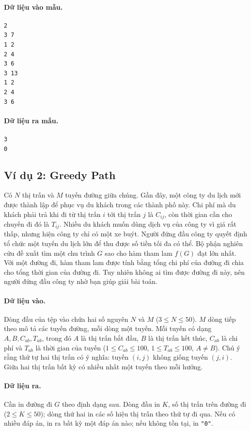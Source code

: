 \documentclass[11pt]{article}
\begin{document}
\paragraph{Dữ liệu vào mẫu.}
\begin{verbatim}
2
3 7
1 2
2 4
3 6
3 13
1 2
2 4
3 6
\end{verbatim}

\paragraph{Dữ liệu ra mẫu.}
\begin{verbatim}
3
0
\end{verbatim}

\subsection{Ví dụ 2: Greedy Path}

Có \(N\) thị trấn và \(M\) tuyến đường giữa chúng. Gần đây, một công ty du lịch
mới được thành lập để phục vụ du khách trong các thành phố này. Chi phí mà du
khách phải trả khi đi từ thị trấn \(i\) tới thị trấn \(j\) là \(C_{ij}\), còn
thời gian cần cho chuyến đi đó là \(T_{ij}\). Nhiều du khách muốn dùng dịch vụ
của công ty vì giá rất thấp, nhưng hiện công ty chỉ có một xe buýt. Người đứng
đầu công ty quyết định tổ chức một tuyến du lịch lớn để thu được số tiền tối đa
có thể. Bộ phận nghiên cứu đề xuất tìm một chu trình \(G\) sao cho hàm tham lam
\(f(G)\) đạt lớn nhất. Với một đường đi, hàm tham lam được tính bằng tổng chi
phí của đường đi chia cho tổng thời gian của đường đi. Tuy nhiên không ai tìm
được đường đi này, nên người đứng đầu công ty nhờ bạn giúp giải bài toán.

\paragraph{Dữ liệu vào.}
Dòng đầu của tệp vào chứa hai số nguyên \(N\) và \(M\) (\(3\le N\le 50\)).
\(M\) dòng tiếp theo mô tả các tuyến đường, mỗi dòng một tuyến. Mỗi tuyến có
dạng \(A,B,C_{ab},T_{ab}\), trong đó \(A\) là thị trấn bắt đầu, \(B\) là thị
trấn kết thúc, \(C_{ab}\) là chi phí và \(T_{ab}\) là thời gian của tuyến
(\(1\le C_{ab}\le 100\), \(1\le T_{ab}\le 100\), \(A\ne B\)). Chú ý rằng thứ
tự hai thị trấn có ý nghĩa: tuyến \((i,j)\) không giống tuyến \((j,i)\). Giữa
hai thị trấn bất kỳ có nhiều nhất một tuyến theo mỗi hướng.

\paragraph{Dữ liệu ra.}
Cần in đường đi \(G\) theo định dạng sau. Dòng đầu in \(K\), số thị trấn trên
đường đi (\(2\le K\le 50\)); dòng thứ hai in các số hiệu thị trấn theo thứ tự
đi qua. Nếu có nhiều đáp án, in ra bất kỳ một đáp án nào; nếu không tồn tại,
in \texttt{"0"}.
\end{document}

